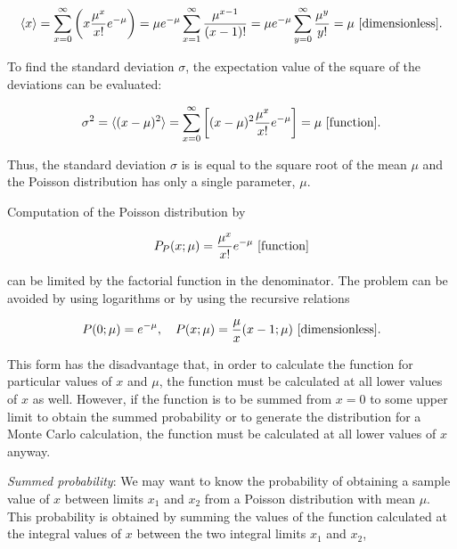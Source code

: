 \documentclass[a4paper,10pt]{article}
\begin{document}
\begin{align*}
    \langle x\rangle = \sum_{x=0}^\infty \left(x\frac{\mu^x}{x!}e^{-\mu}\right) = \mu e^{-\mu} \sum_{x=1}^\infty \frac{\mu^{x-1}}{(x-1)!} = \mu e^{-\mu} \sum_{y=0}^\infty \frac{\mu^y}{y!} = \mu ~ [{\rm dimensionless}].
\end{align*}

{\noindent}To find the standard deviation $\sigma$, the expectation value of the square of the deviations can be evaluated:

\begin{align*}
    \sigma^2 = \langle (x-\mu)^2 \rangle = \sum_{x=0}^\infty \left[ (x-\mu)^2\frac{\mu^x}{x!}e^{-\mu} \right] = \mu ~ [{\rm function}].
\end{align*}

{\noindent}Thus, the standard deviation $\sigma$ is is equal to the square root of the mean $\mu$ and the Poisson distribution has only a single parameter, $\mu$.

{\noindent}Computation of the Poisson distribution by

\begin{align*}
    P_P(x;\mu) = \frac{\mu^x}{x!} e^{-\mu} ~ [{\rm function}]
\end{align*}

{\noindent}can be limited by the factorial function in the denominator. The problem can be avoided by using logarithms or by using the recursive relations

\begin{align*}
    P(0;\mu)=e^{-\mu}, ~~~ P(x;\mu)=\frac{\mu}{x}(x-1;\mu) ~ [{\rm dimensionless}].
\end{align*}

{\noindent}This form has the disadvantage that, in order to calculate the function for particular values of $x$ and $\mu$, the function must be calculated at all lower values of $x$ as well. However, if the function is to be summed from $x=0$ to some upper limit to obtain the summed probability or to generate the distribution for a Monte Carlo calculation, the function must be calculated at all lower values of $x$ anyway.

{\noindent}\textit{Summed probability}: We may want to know the probability of obtaining a sample value of $x$ between limits $x_1$ and $x_2$ from a Poisson distribution with mean $\mu$. This probability is obtained by summing the values of the function calculated at the integral values of $x$ between the two integral limits $x_1$ and $x_2$,
\end{document}
